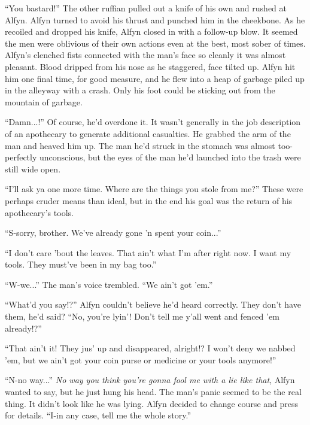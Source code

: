 ``You bastard!'' The other ruffian pulled out a knife of his own and rushed at Alfyn. Alfyn turned to avoid his thrust and punched him in the cheekbone. As he recoiled and dropped his knife, Alfyn closed in with a follow-up blow. It seemed the men were oblivious of their own actions even at the best, most sober of times. Alfyn's clenched fists connected with the man's face so cleanly it was almost pleasant. Blood dripped from his nose as he staggered, face tilted up. Alfyn hit him one final time, for good measure, and he flew into a heap of garbage piled up in the alleyway with a crash. Only his foot could be sticking out from the mountain of garbage.

``Damn...!'' Of course, he'd overdone it. It wasn't generally in the job description of an apothecary to generate additional casualties. He grabbed the arm of the man and heaved him up. The man he'd struck in the stomach was almost too-perfectly unconscious, but the eyes of the man he'd launched into the trash were still wide open.

``I'll ask ya one more time. Where are the things you stole from me?'' These were perhaps cruder means than ideal, but in the end his goal was the return of his apothecary's tools. 

``S-sorry, brother. We've already gone 'n spent your coin...''

``I don't care 'bout the leaves. That ain't what I'm after right now. I want my tools. They must've been in my bag too.''

``W-we...'' The man's voice trembled. ``We ain't got 'em.''

``What'd you say!?'' Alfyn couldn't believe he'd heard correctly. They don't have them, he'd said? ``No, you're lyin'! Don't tell me y'all went and fenced 'em already!?''

``That ain't it! They jus' up and disappeared, alright!? I won't deny we nabbed 'em, but we ain't got your coin purse or medicine or your tools anymore!''

``N-no way...'' \emph{No way you think you're gonna fool me with a lie like that}, Alfyn wanted to say, but he just hung his head. The man's panic seemed to be the real thing. It didn't look like he was lying. Alfyn decided to change course and press for details. ``I-in any case, tell me the whole story.''

